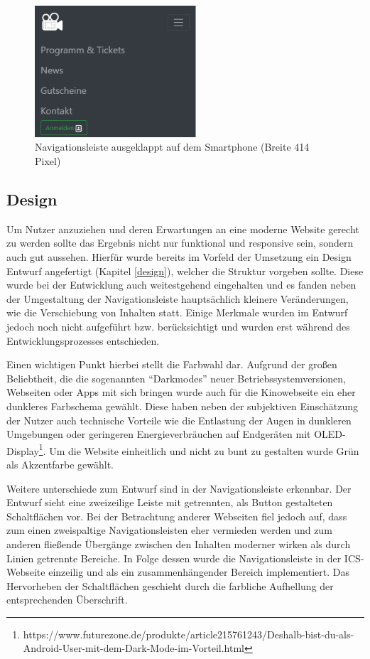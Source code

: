 	\begin{figure}[H]
		\centering 
		\includegraphics[width=6cm]{img/navLeisteAus.png}
		\captionsetup{format=hang}
		\caption[Navigationsleiste ausgeklappt]{\label{fig:navLeisteAus} Navigationsleiste ausgeklappt auf dem Smartphone (Breite 414 Pixel)}
	\end{figure}

	\subsection{Design}
	Um Nutzer anzuziehen und deren Erwartungen an eine moderne Website gerecht zu werden sollte das Ergebnis nicht nur funktional und responsive sein, sondern auch gut aussehen. Hierfür wurde bereits im Vorfeld der Umsetzung ein Design Entwurf angefertigt (Kapitel \vref{design}), welcher die Struktur vorgeben sollte. Diese wurde bei der Entwicklung auch weitestgehend eingehalten und es fanden neben der Umgestaltung der Navigationsleiste hauptsächlich kleinere Veränderungen, wie die Verschiebung von Inhalten statt. Einige Merkmale wurden im Entwurf jedoch noch nicht aufgeführt bzw. berücksichtigt und wurden erst während des Entwicklungsprozesses entschieden. 
	
	
	Einen wichtigen Punkt hierbei stellt die Farbwahl dar. Aufgrund der großen Beliebtheit, die die sogenannten \enquote{Darkmodes} neuer Betriebssystemversionen, Webseiten oder Apps mit sich bringen wurde auch für die Kinowebseite ein eher dunkleres Farbschema gewählt. Diese haben neben der subjektiven Einschätzung der Nutzer auch technische Vorteile wie die Entlastung der Augen in dunkleren Umgebungen oder geringeren Energieverbräuchen auf Endgeräten mit OLED-Display\footnote{https://www.futurezone.de/produkte/article215761243/Deshalb-bist-du-als-Android-User-mit-dem-Dark-Mode-im-Vorteil.html}. Um die Website einheitlich und nicht zu bunt zu gestalten wurde Grün als Akzentfarbe gewählt.
	
	
	Weitere unterschiede zum Entwurf sind in der Navigationsleiste erkennbar. Der Entwurf sieht eine zweizeilige Leiste mit getrennten, als Button gestalteten Schaltflächen vor. Bei der Betrachtung anderer Webseiten fiel jedoch auf, dass zum einen zweispaltige Navigationsleisten eher vermieden werden und zum anderen fließende Übergänge zwischen den Inhalten moderner wirken als durch Linien getrennte Bereiche. In Folge dessen wurde die Navigationsleiste in der \ac{ICS}-Webseite einzeilig und als ein zusammenhängender Bereich implementiert. Das Hervorheben der Schaltflächen geschieht durch die farbliche Aufhellung der entsprechenden Überschrift. 
	
